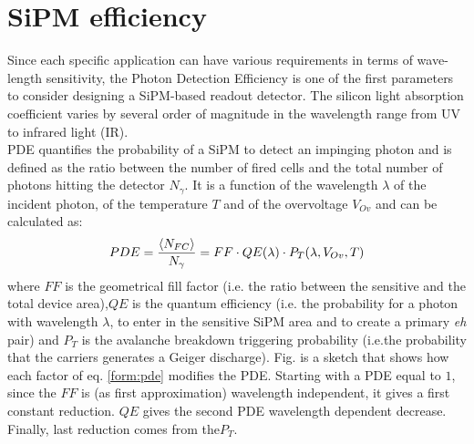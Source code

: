 \section{SiPM efficiency}
Since each specific application can have various requirements in terms of wave-length sensitivity, the Photon Detection Efficiency is one of the first parameters to consider designing a SiPM-based readout detector. The silicon light absorption coefficient varies by several order of magnitude in the wavelength range from UV to infrared light (IR).\\
PDE quantifies the probability of a SiPM to detect an impinging photon and is defined as the ratio between the number of fired cells and the total number of photons hitting the detector $N_\gamma$. It is a function of the wavelength $\lambda$ of the incident photon, of the temperature $T$ and of the overvoltage $V_{Ov}$ and can be calculated as:
\begin{equation}\label{form:pde}
	PDE = \frac{\expval{N_{FC}}}{N_\gamma} = FF \cdot QE(\lambda) \cdot P_T(\lambda, V_{Ov}, T)
\end{equation}
where $FF$ is the geometrical fill factor (i.e. the ratio between the sensitive and the total device area),$QE$ is the quantum efficiency (i.e. the probability for a photon with wavelength $\lambda$, to enter in the sensitive SiPM area and to create a primary \textit{eh} pair) and $P_T$ is the avalanche breakdown triggering probability (i.e.the probability that the carriers generates a Geiger discharge). Fig. is a sketch that shows how each factor of eq. \ref{form:pde} modifies the PDE.
Starting with a PDE equal to $1$, since the $FF$ is (as first approximation) wavelength independent, it gives a first constant reduction. $QE$ gives the second PDE wavelength dependent decrease. Finally, last reduction comes from the$P_T$.\\


